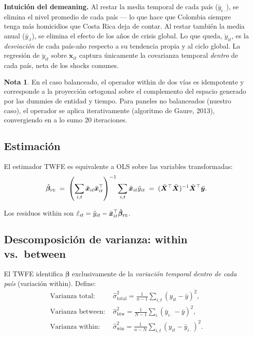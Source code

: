 \documentclass[12pt, a4paper]{article}
\theoremstyle{definition}
\newtheorem{remark}{Nota}[section]
\begin{document}
\begin{intuitionbox}
\textbf{Intuición del demeaning.} Al restar la media temporal de cada país ($\bar{y}_{i\cdot}$), se elimina el nivel promedio de cada país --- lo que hace que Colombia siempre tenga más homicidios que Costa Rica deja de contar. Al restar también la media anual ($\bar{y}_{\cdot t}$), se elimina el efecto de los años de crisis global. Lo que queda, $\ddot{y}_{it}$, es la \emph{desviación} de cada país-año respecto a su tendencia propia y al ciclo global. La regresión de $\ddot{y}_{it}$ sobre $\ddot{\bm{x}}_{it}$ captura únicamente la covarianza temporal \emph{dentro} de cada país, neta de los shocks comunes.
\end{intuitionbox}

\begin{remark}
En el caso balanceado, el operador within de dos vías es idempotente y corresponde a la proyección ortogonal sobre el complemento del espacio generado por las dummies de entidad y tiempo. Para paneles no balanceados (nuestro caso), el operador se aplica iterativamente (algoritmo de Gaure, 2013), convergiendo en a lo sumo 20 iteraciones.
\end{remark}

\subsection{Estimación}

El estimador TWFE es equivalente a OLS sobre las variables transformadas:
\[
  \hat{\bm{\beta}}_{\textsc{fe}} \;=\; \left(\sum_{i,t} \ddot{\bm{x}}_{it}\ddot{\bm{x}}_{it}^\top\right)^{-1} \sum_{i,t} \ddot{\bm{x}}_{it}\ddot{y}_{it}
  \;=\; (\ddot{\bm{X}}^\top\ddot{\bm{X}})^{-1}\ddot{\bm{X}}^\top\ddot{\bm{y}}.
\]

Los residuos within son $\hat{\varepsilon}_{it} = \ddot{y}_{it} - \ddot{\bm{x}}_{it}^\top\hat{\bm{\beta}}_{\textsc{fe}}$.

\subsection{Descomposición de varianza: within vs.\ between}

El TWFE identifica $\bm{\beta}$ exclusivamente de la \emph{variación temporal dentro de cada país} (variación within). Define:
\begin{align*}
  \text{Varianza total: }   & \hat{\sigma}^2_{\text{total}} = \frac{1}{n-1}\sum_{i,t}(y_{it}-\bar{y})^2, \\
  \text{Varianza between: } & \hat{\sigma}^2_{\text{btw}} = \frac{1}{N-1}\sum_{i}(\bar{y}_{i\cdot}-\bar{y})^2, \\
  \text{Varianza within: }  & \hat{\sigma}^2_{\text{win}} = \frac{1}{n-N}\sum_{i,t}(y_{it}-\bar{y}_{i\cdot})^2.
\end{align*}
\end{document}
